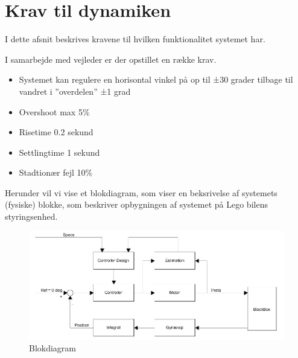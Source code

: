 \graphicspath{{Chapters/Krav/}}


\section{Krav til dynamiken}
I dette afsnit beskrives kravene til hvilken funktionalitet systemet har. 


I samarbejde med vejleder er der opstillet en række krav.
\begin{itemize}
\item Systemet kan regulere en horisontal vinkel på op til ±30 grader tilbage til vandret i ”overdelen” ±1 grad
\item Overshoot max 5\%
\item Risetime 0.2 sekund 
\item Settlingtime 1 sekund 
\item Stadtionær fejl 10\%  

\end{itemize}



Herunder vil vi vise et blokdiagram, som viser en beksrivelse af systemets (fysiske) blokke, som beskriver opbygningen af systemet på Lego bilens styringsenhed. 


\begin{figure}[H]
	\centering
	\includegraphics[width = 400 pt]{Img/blokdiagram.png}
	\caption{Blokdiagram}
	\label{fig:Blokdiagram}
\end{figure}
